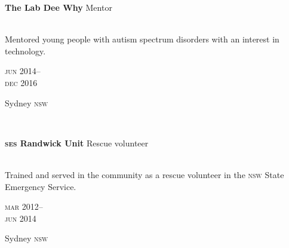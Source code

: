 

\begin{minipage}[t]{\mainboxwidth\textwidth}
\textbf{The Lab Dee Why}\phantom{..} Mentor \\
\\
{\small
Mentored young people with autism spectrum disorders with an interest in technology.
\par}
\end{minipage}
\begin{minipage}[t]{\detailboxwidth\textwidth}
{
\hfill \textsc{jun} 2014--\\ 
\hspace*{0pt} \hfill \textsc{dec} 2016
\par
{\small\hfill Sydney \textsc{nsw}}
}
\end{minipage}
\\

\begin{minipage}[t]{\mainboxwidth\textwidth}
\textbf{\textsc{ses} Randwick Unit}\phantom{..} Rescue volunteer\\
\\
{\small
Trained and served in the community as a rescue volunteer in the \textsc{nsw} State Emergency Service.
\par}
\end{minipage}
\begin{minipage}[t]{\detailboxwidth\textwidth}
{
\hfill \textsc{mar} 2012--\\ 
\hspace*{0pt} \hfill \textsc{jun} 2014
\par
{\small\hfill Sydney \textsc{nsw}}
}
\end{minipage}

